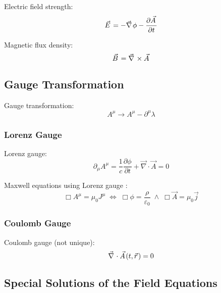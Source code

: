 		\noindent
		Electric field strength:
		\begin{equation}
			\vec{E} = -\Nabla\phi-\pdv{\vec{A}}{t}
		\end{equation}

		\noindent
		Magnetic flux density:
		\begin{equation}
			\vec{B} = \Nabla\times\vec{A}
		\end{equation}

	\subsection{Gauge Transformation}
		\noindent
		Gauge transformation:
		\begin{equation}
			A^\mu \rightarrow A^\mu-\partial^\mu \lambda
		\end{equation}

		\subsubsection{Lorenz Gauge}
			\noindent
			Lorenz gauge:
			\begin{equation}
				\partial_\mu A^\mu = \frac{1}{c}\frac{\partial \phi}{\partial t} + \vec{\nabla}\cdot\vec{A} = 0
			\end{equation}

			\noindent
			Maxwell equations using Lorenz gauge :
			\begin{equation}
				\Box A^\mu = \mu_0 J^\mu \;\Leftrightarrow\;
				\Box \phi = \dfrac{\rho}{\varepsilon_0} \;\wedge\;
				\Box \vec{A} = \mu_0 \vec{j}
			\end{equation}

		\subsubsection{Coulomb Gauge }
			\noindent
			Coulomb gauge (not unique):
			\begin{equation}
				\Nabla\cdot\vec{A}(t,\vec{r})=0
			\end{equation}

	\subsection{Special Solutions of the Field Equations}
